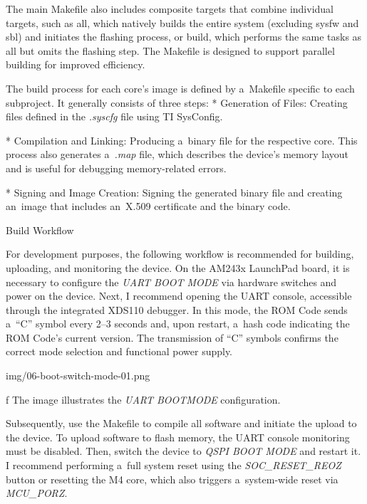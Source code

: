 The main Makefile also includes composite targets that combine individual targets, such as {\sbf all}, which natively builds the entire system (excluding sysfw and sbl) and initiates the flashing process, or {\sbf build}, which performs the same tasks as {\sbf all} but omits the flashing step. The Makefile is designed to support parallel building for improved efficiency.

The build process for each core’s image is defined by a~Makefile specific to each subproject. It generally consists of three steps:
\begitems
* {\sbf Generation of Files}: Creating files defined in the {\it .syscfg} file using TI SysConfig.

* {\sbf Compilation and Linking}: Producing a~binary file for the respective core. This process also generates a~{\it .map} file, which describes the device’s memory layout and is useful for debugging memory-related errors.

* {\sbf Signing and Image Creation}: Signing the generated binary file and creating an~image that includes an~X.509 certificate and the binary code.

\enditems

\secc Build Workflow

For development purposes, the following workflow is recommended for building, uploading, and monitoring the device. On the AM243x LaunchPad board, it is necessary to configure the {\it UART BOOT MODE} via hardware switches and power on the device. Next, I recommend opening the UART console, accessible through the integrated XDS110 debugger. In this mode, the ROM Code sends a~“C” symbol every 2–3 seconds and, upon restart, a~hash code indicating the ROM Code’s current version. The transmission of “C” symbols confirms the correct mode selection and functional power supply.

\medskip
{}
\picw=6cm \cinspic img/06-boot-switch-mode-01.png
\caption/f The image illustrates the {\it UART BOOTMODE} configuration.
\medskip

Subsequently, use the Makefile to compile all software and initiate the upload to the device. To upload software to flash memory, the UART console monitoring must be disabled. Then, switch the device to {\it QSPI BOOT MODE} and restart it. I recommend performing a~full system reset using the {\it SOC_RESET_REOZ} button or resetting the M4 core, which also triggers a~system-wide reset via {\it MCU_PORZ}.

